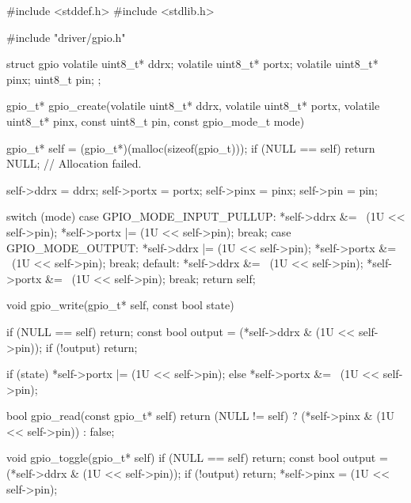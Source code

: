 \begin{ccode}
#include <stddef.h>
#include <stdlib.h>

#include "driver/gpio.h"

struct gpio
{
    volatile uint8_t* ddrx;
    volatile uint8_t* portx;
    volatile uint8_t* pinx;
    uint8_t pin;
};

gpio_t* gpio_create(volatile uint8_t* ddrx, volatile uint8_t* portx, volatile uint8_t* pinx,
                     const uint8_t pin, const gpio_mode_t mode)
{
    gpio_t* self = (gpio_t*)(malloc(sizeof(gpio_t)));
    if (NULL == self) { return NULL; } // Allocation failed.

    self->ddrx = ddrx;
    self->portx = portx;
    self->pinx = pinx;
    self->pin = pin;

    switch (mode)
    {
        case GPIO_MODE_INPUT_PULLUP:
            *self->ddrx &= ~(1U << self->pin);
            *self->portx |= (1U << self->pin);
            break;
        case GPIO_MODE_OUTPUT:
            *self->ddrx |= (1U << self->pin);
            *self->portx &= ~(1U << self->pin);
            break;
        default:
            *self->ddrx &= ~(1U << self->pin);
            *self->portx &= ~(1U << self->pin);
            break;
    }
    return self;
}

void gpio_write(gpio_t* self, const bool state)
{
    if (NULL == self) { return; }
    const bool output = (*self->ddrx & (1U << self->pin));
    if (!output) { return; }

    if (state) { *self->portx |= (1U << self->pin); }
    else { *self->portx &= ~(1U << self->pin); }
}

bool gpio_read(const gpio_t* self)
{
    return (NULL != self) ? (*self->pinx & (1U << self->pin)) : false;
}

void gpio_toggle(gpio_t* self)
{
    if (NULL == self) { return; }
    const bool output = (*self->ddrx & (1U << self->pin));
    if (!output) { return; }
    *self->pinx = (1U << self->pin);
}
\end{ccode}

